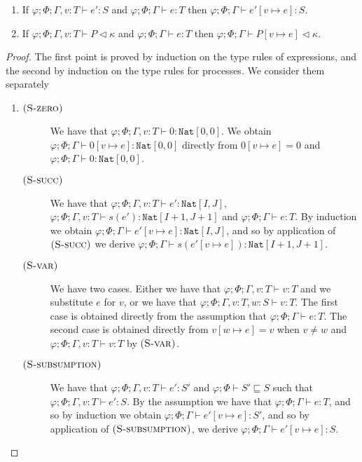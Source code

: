 \begin{lemma}[Substitution]\text{ }
\begin{enumerate}
    \item If $\varphi;\Phi;\Gamma,v:T\vdash e' : S$ and $\varphi;\Phi;\Gamma\vdash e : T$ then $\varphi;\Phi;\Gamma\vdash e'[v\mapsto e] : S$.
    \item If $\varphi;\Phi;\Gamma,v:T\vdash P \triangleleft \kappa$ and $\varphi;\Phi;\Gamma\vdash e : T$ then $\varphi;\Phi;\Gamma\vdash P[v\mapsto e] \triangleleft \kappa$.
\end{enumerate}
\begin{proof} The first point is proved by induction on the type rules of expressions, and the second by induction on the type rules for processes. We consider them separately
\begin{enumerate}
    \item 
\begin{description}
%
\item[$\mbox{\textsc{\protect{(S-zero})}}$] We have that $\varphi;\Phi;\Gamma,v:T\vdash 0 : \texttt{Nat}[0,0]$. We obtain $\varphi;\Phi;\Gamma\vdash 0[v\mapsto e] : \texttt{Nat}[0,0]$ directly from $0[v\mapsto e] = 0$ and $\varphi;\Phi;\Gamma\vdash 0 : \texttt{Nat}[0,0]$.
%
\item[$\mbox{\textsc{\protect{(S-succ})}}$] We have that $\varphi;\Phi;\Gamma,v:T\vdash e' : \texttt{Nat}[I,J]$, $\varphi;\Phi;\Gamma,v:T\vdash s(e') : \texttt{Nat}[I+1,J+1]$ and $\varphi;\Phi;\Gamma\vdash e : T$. By induction we obtain $\varphi;\Phi;\Gamma\vdash e'[v\mapsto e] : \texttt{Nat}[I,J]$, and so by application of $\mbox{\textsc{\protect{(S-succ})}}$ we derive $\varphi;\Phi;\Gamma\vdash s(e'[v\mapsto e]) : \texttt{Nat}[I+1,J+1]$.
%
\item[$\mbox{\textsc{\protect{(S-var})}}$] We have two cases. Either we have that $\varphi;\Phi;\Gamma,v:T\vdash v : T$ and we substitute $e$ for $v$, or we have that $\varphi;\Phi;\Gamma,v:T,w:S\vdash v : T$. The first case is obtained directly from the assumption that $\varphi;\Phi;\Gamma\vdash e : T$. The second case is obtained directly from $v[w\mapsto e] = v$ when $v\neq w$ and $\varphi;\Phi;\Gamma,v:T\vdash v : T$ by $\mbox{\textsc{\protect{(S-var})}}$.
%
\item[$\mbox{\textsc{\protect{(S-subsumption})}}$] We have that $\varphi;\Phi;\Gamma,v:T\vdash e' : S'$ and $\varphi;\Phi\vdash S' \sqsubseteq S$ such that $\varphi;\Phi;\Gamma,v:T\vdash e' : S$. By the assumption we have that $\varphi;\Phi;\Gamma\vdash e : T$, and so by induction we obtain $\varphi;\Phi;\Gamma\vdash e'[v\mapsto e] : S'$, and so by application of $\mbox{\textsc{\protect{(S-subsumption})}}$, we derive $\varphi;\Phi;\Gamma\vdash e'[v\mapsto e] : S$.

\end{description}
\end{enumerate}
\end{proof}
\end{lemma}

